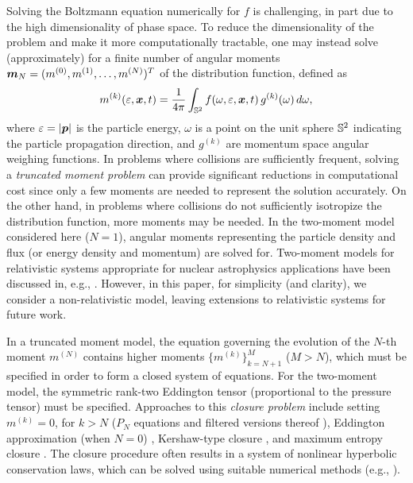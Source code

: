 Solving the Boltzmann equation numerically for $f$ is challenging, in part due to the high dimensionality of phase space.  
To reduce the dimensionality of the problem and make it more computationally tractable, one may instead solve (approximately) for a finite number of angular moments $\boldsymbol{m}_{N}=(m^{(0)},m^{(1)},\ldots,m^{(N)})^{T}$ of the distribution function, defined as
\begin{equation}
  m^{(k)}(\varepsilon,\boldsymbol{x},t)=\frac{1}{4\pi}\int_{\mathbb{S}^{2}}f(\omega,\varepsilon,\boldsymbol{x},t)\,g^{(k)}(\omega)\,d\omega,
\end{equation}
where $\varepsilon=|\boldsymbol{p}|$ is the particle energy, $\omega$ is a point on the unit sphere $\mathbb{S}^{2}$ indicating the particle propagation direction, and $g^{(k)}$ are momentum space angular weighing functions.  
In problems where collisions are sufficiently frequent, solving a \emph{truncated moment problem} can provide significant reductions in computational cost since only a few moments are needed to represent the solution accurately.  
On the other hand, in problems where collisions do not sufficiently isotropize the distribution function, more moments may be needed.  
In the two-moment model considered here ($N=1$), angular moments representing the particle density and flux (or energy density and momentum) are solved for.  
Two-moment models for relativistic systems appropriate for nuclear astrophysics applications have been discussed in, e.g., \cite{lindquist_1966,andersonSpiegel_1972,thorne_1981,shibata_etal_2011,cardall_etal_2013a}.  
However, in this paper, for simplicity (and clarity), we consider a non-relativistic model, leaving extensions to relativistic systems for future work.  

In a truncated moment model, the equation governing the evolution of the \mbox{$N$-th} moment $m^{(N)}$ contains higher moments $\{m^{(k)}\}_{k=N+1}^{M}$ ($M>N$), which must be specified in order to form a closed system of equations.  
For the two-moment model, the symmetric rank-two Eddington tensor (proportional to the pressure tensor) must be specified.  
Approaches to this \emph{closure problem} include setting $m^{(k)}=0$, for $k>N$ ($P_N$ equations \cite{brunnerHolloway_2005} and filtered versions thereof \cite{mcclarrenHauck_2010,laboure_etal_2016}), Eddington approximation (when $N=0$) \cite{mihalasMihalas_1999}, Kershaw-type closure \cite{kershaw_1976}, and maximum entropy closure \cite{minerbo_1978,cernohorskyBludman_1994,olbrant_etal_2013}.  
The closure procedure often results in a system of nonlinear hyperbolic conservation laws, which can be solved using suitable numerical methods (e.g., \cite{leveque_1992}).  

